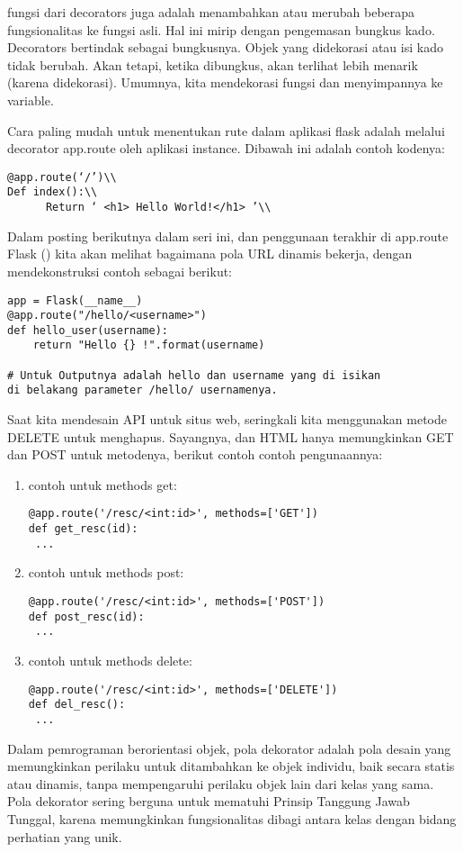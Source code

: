 \documentclass[12pt,a4paper]{article}
\begin{document}
fungsi dari decorators juga adalah menambahkan atau merubah beberapa fungsionalitas ke fungsi asli. Hal ini mirip dengan pengemasan bungkus kado. Decorators bertindak sebagai bungkusnya. Objek yang didekorasi atau isi kado tidak berubah. Akan tetapi, ketika dibungkus, akan terlihat lebih menarik (karena didekorasi). Umumnya, kita mendekorasi fungsi dan menyimpannya ke variable.

Cara paling mudah untuk menentukan rute dalam aplikasi flask adalah melalui decorator app.route oleh aplikasi instance. Dibawah ini adalah contoh kodenya:\\
\begin{verbatim}
@app.route(‘/’)\\
Def index():\\
      Return ‘ <h1> Hello World!</h1> ’\\
\end{verbatim}

Dalam posting berikutnya dalam seri ini, dan penggunaan terakhir di app.route Flask () kita akan melihat bagaimana pola URL dinamis bekerja, dengan mendekonstruksi contoh sebagai berikut:

\begin{verbatim}
app = Flask(__name__)
@app.route("/hello/<username>")
def hello_user(username):
    return "Hello {} !".format(username)
    
# Untuk Outputnya adalah hello dan username yang di isikan 
di belakang parameter /hello/ usernamenya.
\end{verbatim}

Saat kita mendesain API untuk situs web, seringkali kita menggunakan metode DELETE untuk menghapus. Sayangnya, dan HTML hanya memungkinkan GET dan POST untuk metodenya, berikut contoh contoh pengunaannya:

\begin{enumerate}
\item contoh untuk methods get:
\begin{verbatim} 
@app.route('/resc/<int:id>', methods=['GET'])
def get_resc(id):
 ...
\end{verbatim}

\item contoh untuk methods post:
\begin{verbatim} 
@app.route('/resc/<int:id>', methods=['POST'])
def post_resc(id):
 ...
\end{verbatim}

\item contoh untuk methods delete:
\begin{verbatim} 
@app.route('/resc/<int:id>', methods=['DELETE'])
def del_resc():
 ...
\end{verbatim}
\end{enumerate}
Dalam pemrograman berorientasi objek, pola dekorator adalah pola desain yang memungkinkan perilaku untuk ditambahkan ke objek individu, baik secara statis atau dinamis, tanpa mempengaruhi perilaku objek lain dari kelas yang sama. Pola dekorator sering berguna untuk mematuhi Prinsip Tanggung Jawab Tunggal, karena memungkinkan fungsionalitas dibagi antara kelas dengan bidang perhatian yang unik.
\end{document}
